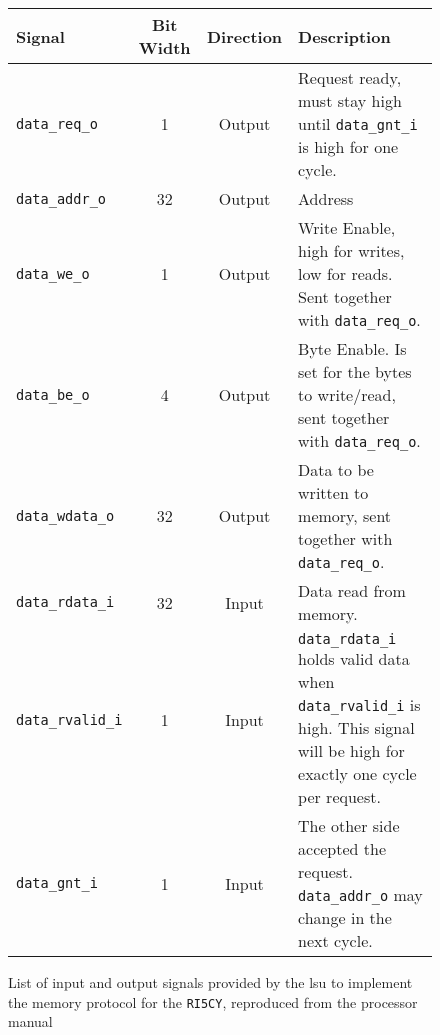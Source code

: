 \begin{figure}[htbp]
	\renewcommand{\arraystretch}{1.4}
	\begin{tabular}{lccp{7cm}}
		\hline
		\textbf{Signal} & \textbf{Bit Width} &\textbf{Direction} & \textbf{Description} \\
		\hline
		\texttt{data\_req\_o}
& 1 & Output & Request ready, must stay high until \texttt{data\_gnt\_i} is high for one cycle. \\
		\texttt{data\_addr\_o} & 32 & Output & Address \\
	  	\texttt{data\_we\_o}
& 1 & Output & Write Enable, high for writes, low for reads. Sent together with \texttt{data\_req\_o}. \\
	  	\texttt{data\_be\_o} & 4 & Output & Byte Enable. Is set for the bytes to write/read, sent together with \texttt{data\_req\_o}. \\
	  	\texttt{data\_wdata\_o} & 32
& Output & Data to be written to memory, sent together with \texttt{data\_req\_o}. \\
	  	\texttt{data\_rdata\_i} & 32 & Input & Data read from memory. \\
		\texttt{data\_rvalid\_i} & 1 & Input & \texttt{data\_rdata\_i} holds valid data when \texttt{data\_rvalid\_i} is high. This signal will be high for exactly one cycle per request. \\
		\texttt{data\_gnt\_i} & 1 & Input & The other side accepted the request. \texttt{data\_addr\_o} may change in the next cycle. \\
		\hline
	\end{tabular}
\caption{List of input and output signals provided by the \gls{lsu} to implement the memory protocol for the \texttt{RI5CY}, reproduced from the processor manual \cite{andreastraberRI5CYUserManual2017}}
\label{fig:signal-table}
\end{figure}

